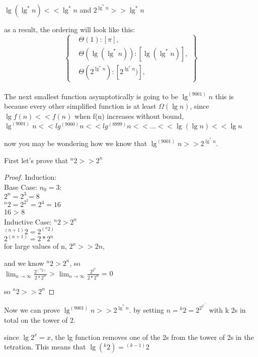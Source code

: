 \documentclass[11pt,fleqn]{article}
\theoremstyle{definition}
\theoremstyle{remark}
\begin{document}
$\lg(\lg^*n) << \lg^*n$ and $2^{\lg^*n} >> \lg^*n$

as a result, the ordering will look like this:\\

\[
\left\{
\begin{aligned}
& \Theta(1): [\pi],\\
& \Theta(\lg(\lg^*n)): [\lg(\lg^*n)],\\
& \Theta(2^{\lg^*n}): [2^{\lg^*n})],
\end{aligned}
\right\}
\]\\

The next smallest function asymptotically is going to be $\lg^{(9001)} n$
this is because every other simplified function is at least $\Omega(\lg n)$,
since $\lg{f(n)} << f(n)$ when f(n) increases without bound, 
$\lg^{(9001)} n << lg^{(9000)} n << lg^{(8999)} n << ... << \lg (\lg n) << \lg n$ 

now you may be wondering how we know that $\lg^{(9001)} n >> 2^{\lg^*n}$.

First let's prove that ${}^n 2 >> 2^n$

\begin{proof}
Induction:\\

Base Case: $n_0 = 3$:\\
$2^n = 2^3 = 8$\\
${}^n 2 = 2^{2^2} = 2^4 = 16$\\
16 > 8\\

Inductive Case: ${}^n 2 > 2^n$\\
${}^{(n+1)} 2 = 2^{({}^n 2)}$\\
$2^{(n+1)} = 2 * 2^n$\\

for large values of n, $2^n >> 2n$,

and we know ${}^n 2 > 2^n$, so\\

$\lim_{n \to \infty} \frac{2^{({}^n 2)}}{2*2^n}$ >
$\lim_{n \to \infty} \frac{2^{2^n}}{2*2^n}$ = 0

so ${}^n 2 >> 2^n$
\end{proof}
Now we can prove $\lg^{(9001)} n >> 2^{\lg^*n}$. by setting $n = {}^k 2 = 2^{2^{2^{\cdot^{\cdot^{\cdot 2}}}}}$ with k
2s in total on the tower of 2.

since $\lg2^x = x$, the lg function removes one of the 2s from
the tower of 2s in the tetration. This means that $\lg{({}^k 2)} = {}^{(k-1)} 2$
\end{document}
